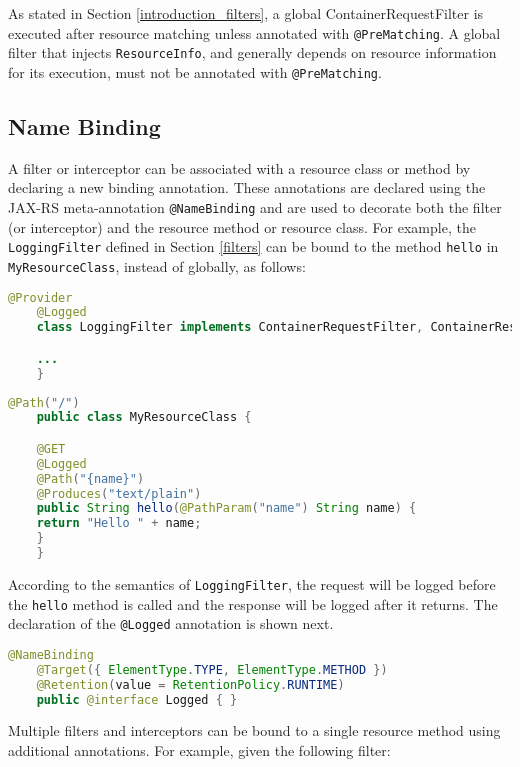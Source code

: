 As stated in Section \ref{introduction_filters}, a global ContainerRequestFilter is executed after resource matching
unless annotated with \lstinline{@PreMatching}. A global filter that injects \lstinline{ResourceInfo}, and generally
depends on resource information for its execution, must not be annotated with \lstinline{@PreMatching}.

\subsection{Name Binding}
\label{Name_Binding}

A filter or interceptor can be associated with a resource class or method by declaring a new binding annotation. These
annotations are declared using the JAX-RS meta-annotation \lstinline{@NameBinding} and are used to decorate both the
filter (or interceptor) and the resource method or resource class. For example, the \lstinline{LoggingFilter} defined in
Section \ref{filters} can be bound to the method \lstinline{hello} in \lstinline{MyResourceClass}, instead of globally,
as follows:

\begin{lstlisting}[language=Java]
    @Provider
    @Logged
    class LoggingFilter implements ContainerRequestFilter, ContainerResponseFilter {

    ...
    }
\end{lstlisting}

\begin{lstlisting}[language=Java]
    @Path("/")
    public class MyResourceClass {

    @GET
    @Logged
    @Path("{name}")
    @Produces("text/plain")
    public String hello(@PathParam("name") String name) {
    return "Hello " + name;
    }
    }
\end{lstlisting}

According to the semantics of \lstinline{LoggingFilter}, the request will be logged before the \lstinline{hello} method
is called and the response will be logged after it returns. The declaration of the \lstinline{@Logged} annotation is
shown next.

\begin{lstlisting}[language=Java]
    @NameBinding
    @Target({ ElementType.TYPE, ElementType.METHOD })
    @Retention(value = RetentionPolicy.RUNTIME)
    public @interface Logged { }
\end{lstlisting}

Multiple filters and interceptors can be bound to a single resource method using additional annotations. For example,
given the following filter:

